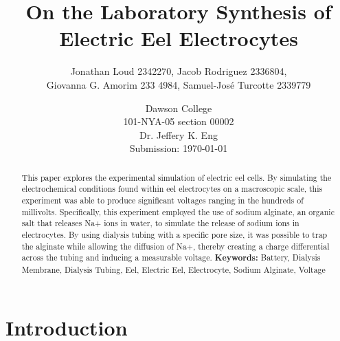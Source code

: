 \documentclass[letterpaper]{article}
\title{On the Laboratory Synthesis of Electric Eel Electrocytes}
\author{Jonathan Loud 2342270, Jacob Rodriguez 2336804, \\
Giovanna G. Amorim 233 4984, Samuel-José Turcotte 2339779}
\date{Dawson College \\[25pt]
101-NYA-05 section 00002\\[25pt]
Dr. Jeffery K. Eng\\[25pt]
Submission: \today}
\begin{document}
\maketitle

\begin{abstract}
    This paper explores the experimental simulation of electric eel cells. By simulating the electrochemical 
	conditions found within eel electrocytes on a macroscopic scale, this experiment was able to produce 
	significant voltages ranging in the hundreds of millivolts. Specifically, this experiment employed 
	the use of sodium alginate, an organic salt that releases Na+ ions in water, to simulate the release of sodium 
	ions in electrocytes. By using dialysis tubing with a specific pore size, it was possible to trap the alginate 
	while allowing the diffusion of Na+, thereby creating a charge differential across the tubing and inducing a measurable
	voltage.
	\noindent\textbf{Keywords:} Battery, Dialysis Membrane, Dialysis Tubing, Eel, Electric Eel, Electrocyte, Sodium Alginate, Voltage
\end{abstract}

\tableofcontents

\newpage

\section{Introduction}
\label{sec:introduction}
\end{document}
